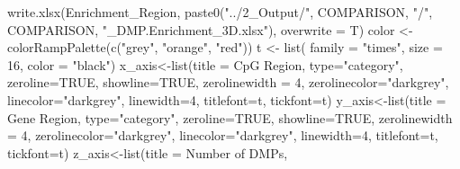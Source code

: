 \documentclass[
  10pt,
]{article}
\newenvironment{Shaded}{\begin{snugshade}}{\end{snugshade}}
\newcommand{\AttributeTok}[1]{\textcolor[rgb]{0.77,0.63,0.00}{#1}}
\newcommand{\ConstantTok}[1]{\textcolor[rgb]{0.00,0.00,0.00}{#1}}
\newcommand{\DecValTok}[1]{\textcolor[rgb]{0.00,0.00,0.81}{#1}}
\newcommand{\FunctionTok}[1]{\textcolor[rgb]{0.00,0.00,0.00}{#1}}
\newcommand{\NormalTok}[1]{#1}
\newcommand{\OtherTok}[1]{\textcolor[rgb]{0.56,0.35,0.01}{#1}}
\newcommand{\StringTok}[1]{\textcolor[rgb]{0.31,0.60,0.02}{#1}}
\begin{document}
\begin{Shaded}
\begin{Highlighting}[]
\FunctionTok{write.xlsx}\NormalTok{(Enrichment\_Region, }\FunctionTok{paste0}\NormalTok{(}\StringTok{"../2\_Output/"}\NormalTok{, COMPARISON, }\StringTok{"/"}\NormalTok{, COMPARISON, }\StringTok{"\_DMP.Enrichment\_3D.xlsx"}\NormalTok{), }\AttributeTok{overwrite =}\NormalTok{ T)}
\NormalTok{color }\OtherTok{\textless{}{-}} \FunctionTok{colorRampPalette}\NormalTok{(}\FunctionTok{c}\NormalTok{(}\StringTok{"grey"}\NormalTok{, }\StringTok{"orange"}\NormalTok{, }\StringTok{"red"}\NormalTok{))}
\NormalTok{t }\OtherTok{\textless{}{-}} \FunctionTok{list}\NormalTok{(}
  \AttributeTok{family =} \StringTok{"times"}\NormalTok{,}
  \AttributeTok{size =} \DecValTok{16}\NormalTok{,}
  \AttributeTok{color =} \StringTok{"black"}\NormalTok{)}
\NormalTok{x\_axis}\OtherTok{\textless{}{-}}\FunctionTok{list}\NormalTok{(}\AttributeTok{title =} \StringTok{\textquotesingle{}CpG Region\textquotesingle{}}\NormalTok{, }
                     \AttributeTok{type=}\StringTok{"category"}\NormalTok{, }
                     \AttributeTok{zeroline=}\ConstantTok{TRUE}\NormalTok{, }
                     \AttributeTok{showline=}\ConstantTok{TRUE}\NormalTok{, }
                     \AttributeTok{zerolinewidth =} \DecValTok{4}\NormalTok{, }
            \AttributeTok{zerolinecolor=}\StringTok{"darkgrey"}\NormalTok{, }
            \AttributeTok{linecolor=}\StringTok{"darkgrey"}\NormalTok{, }
            \AttributeTok{linewidth=}\DecValTok{4}\NormalTok{, }
            \AttributeTok{titlefont=}\NormalTok{t, }
            \AttributeTok{tickfont=}\NormalTok{t)}
\NormalTok{y\_axis}\OtherTok{\textless{}{-}}\FunctionTok{list}\NormalTok{(}\AttributeTok{title =} \StringTok{\textquotesingle{}Gene Region\textquotesingle{}}\NormalTok{, }
                     \AttributeTok{type=}\StringTok{"category"}\NormalTok{, }
                     \AttributeTok{zeroline=}\ConstantTok{TRUE}\NormalTok{, }
                     \AttributeTok{showline=}\ConstantTok{TRUE}\NormalTok{, }
                     \AttributeTok{zerolinewidth =} \DecValTok{4}\NormalTok{, }
            \AttributeTok{zerolinecolor=}\StringTok{"darkgrey"}\NormalTok{, }
            \AttributeTok{linecolor=}\StringTok{"darkgrey"}\NormalTok{, }
            \AttributeTok{linewidth=}\DecValTok{4}\NormalTok{, }
            \AttributeTok{titlefont=}\NormalTok{t, }
            \AttributeTok{tickfont=}\NormalTok{t)}
\NormalTok{z\_axis}\OtherTok{\textless{}{-}}\FunctionTok{list}\NormalTok{(}\AttributeTok{title =} \StringTok{\textquotesingle{}Number of DMPs\textquotesingle{}}\NormalTok{, }

\end{Highlighting}
\end{Shaded}
\end{document}
